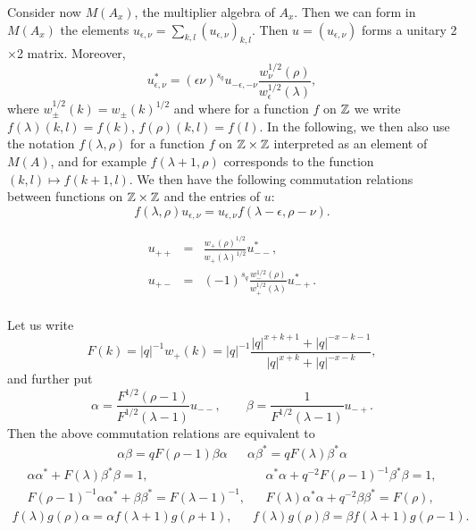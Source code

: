 Consider now $M(A_x)$, the multiplier algebra of $A_x$. Then we can form in $M(A_x)$ the elements $u_{\epsilon,\nu} = \sum_{k,l} (u_{\epsilon,\nu})_{k,l}$. Then $u=(u_{\epsilon,\nu})$ forms a unitary 2$\times$2 matrix. Moreover, \[u_{\epsilon,\nu}^* = (\epsilon\nu)^{s_q} u_{-\epsilon,-\nu}\frac{w_{\nu}^{1/2}(\rho)}{w_{\epsilon}^{1/2}(\lambda)} ,\] where $w_{\pm}^{1/2}(k) = w_{\pm}(k)^{1/2}$ and where for a function $f$ on $\mathbb{Z}$ we write $f(\lambda)(k,l) = f(k)$, $f(\rho)(k,l) = f(l)$. In the following, we then also use the notation $f(\lambda,\rho)$ for a function $f$ on $\mathbb{Z}\times \mathbb{Z}$ interpreted as an element of $M(A)$, and for example $f(\lambda+1,\rho)$ corresponds to the function $(k,l)\mapsto f(k+1,l)$. We then have the following commutation relations between functions on $\mathbb{Z}\times \mathbb{Z}$ and the entries of $u$: \[f(\lambda,\rho)u_{\epsilon,\nu} = u_{\epsilon,\nu}f(\lambda-\epsilon,\rho-\nu).\]



\begin{eqnarray*} u_{++} &=& \frac{w_+(\rho)^{1/2}}{w_+(\lambda)^{1/2}}u_{--}^*,\\u_{+-}&=& (-1)^{s_q}  \frac{w_-^{1/2}(\rho)}{w_+^{1/2}(\lambda)}u_{-+}^*.  \\ 
\end{eqnarray*}

Let us write \[F(k) = |q|^{-1}w_+(k) =  |q|^{-1}\frac{|q|^{x+k+1}+|q|^{-x-k-1}}{|q|^{x+k}+|q|^{-x-k}},\] and further put\[\alpha = \frac{F^{1/2}(\rho-1)}{F^{1/2}(\lambda-1)}u_{--},\qquad \beta = \frac{1}{F^{1/2}(\lambda-1)}u_{-+}.\] Then the above commutation relations are equivalent to \begin{align*} \alpha \beta = qF(\rho-1)\beta\alpha && \alpha\beta^* = qF(\lambda)\beta^*\alpha\end{align*} \begin{align*} \alpha\alpha^* +F(\lambda)\beta^*\beta = 1,&& \alpha^*\alpha+q^{-2}F(\rho-1)^{-1}\beta^*\beta = 1,\\ F(\rho-1)^{-1}\alpha\alpha^* +\beta\beta^* = F(\lambda-1)^{-1},&& F(\lambda)\alpha^*\alpha +q^{-2}\beta\beta^* = F(\rho),\end{align*} \begin{align*} f(\lambda)g(\rho)\alpha =
\alpha f(\lambda+1)g(\rho+1),&& f(\lambda)g(\rho)\beta = \beta f(\lambda+1)g(\rho-1).\end{align*}

